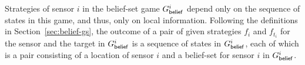 
Strategies of sensor $i$ in the belief-set game $G^{i}_{\mathsf{belief}}$ depend only on the sequence of states in this game, and thus, only on local information. Following the definitions in Section~\ref{sec:belief-gs}, the outcome of a pair of given strategies $f_{i}$ and $f_{t_i}$ for the sensor and the target in $G^{i}_{\mathsf{belief}}$  is a sequence of  states in  $G^{i}_{\mathsf{belief}}$, each of which is a pair consisting of a location of sensor $i$ and a belief-set for sensor $i$ in $G^{i}_{\mathsf{belief}}$.



